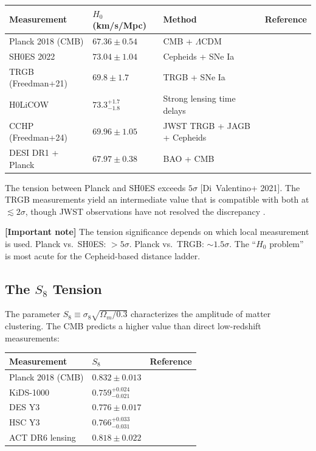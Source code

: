 \documentclass[11pt,a4paper]{article}
\theoremstyle{plain}
\theoremstyle{definition}
\theoremstyle{remark}
\newcommand{\fromlit}[1]{\textcolor{blue!70!black}{\textsf{[#1]}}}
\newcommand{\signcorrection}[1]{%
  \par\smallskip\noindent
  \colorbox{red!10}{\parbox{\dimexpr\linewidth-2\fboxsep}{%
    \textcolor{red!60!black}{\textbf{[Important note]}} #1}}%
  \par\smallskip}
\begin{document}
\begin{center}
\begin{tabular}{llll}
\toprule
\textbf{Measurement} & $H_0$ (km/s/Mpc) & \textbf{Method} & \textbf{Reference} \\
\midrule
Planck 2018 (CMB) & $67.36 \pm 0.54$ & CMB + $\Lambda$CDM & \cite{Planck18VI} \\
SH0ES 2022 & $73.04 \pm 1.04$ & Cepheids + SNe Ia & \cite{Riess22} \\
TRGB (Freedman+21) & $69.8 \pm 1.7$ & TRGB + SNe Ia & \cite{Freedman21} \\
H0LiCOW & $73.3^{+1.7}_{-1.8}$ & Strong lensing time delays & \cite{Wong20} \\
CCHP (Freedman+24) & $69.96 \pm 1.05$ & JWST TRGB + JAGB + Cepheids & \cite{Freedman24} \\
DESI DR1 + Planck & $67.97 \pm 0.38$ & BAO + CMB & \cite{DESI24} \\
\bottomrule
\end{tabular}
\end{center}

The tension between Planck and SH0ES exceeds $5\sigma$
\fromlit{Di~Valentino+ 2021}. The TRGB measurements yield an
intermediate value that is compatible with both at $\lesssim 2\sigma$,
though JWST observations have not resolved the discrepancy
\cite{Freedman24}.

\signcorrection{The tension significance depends on which local
measurement is used. Planck vs.\ SH0ES: $>5\sigma$. Planck vs.\ TRGB:
$\sim 1.5\sigma$. The ``$H_0$ problem'' is most acute for the
Cepheid-based distance ladder.}

\subsection{The $S_8$ Tension}

The parameter $S_8 \equiv \sigma_8\sqrt{\Omega_m/0.3}$ characterizes the
amplitude of matter clustering. The CMB predicts a higher value than
direct low-redshift measurements:

\begin{center}
\begin{tabular}{lll}
\toprule
\textbf{Measurement} & $S_8$ & \textbf{Reference} \\
\midrule
Planck 2018 (CMB) & $0.832 \pm 0.013$ & \cite{Planck18VI} \\
KiDS-1000 & $0.759^{+0.024}_{-0.021}$ & \cite{KiDS1000} \\
DES Y3 & $0.776 \pm 0.017$ & \cite{DESY3} \\
HSC Y3 & $0.766^{+0.033}_{-0.031}$ & \cite{HSC23} \\
ACT DR6 lensing & $0.818 \pm 0.022$ & \cite{ACT23} \\
\bottomrule
\end{tabular}
\end{center}
\end{document}
